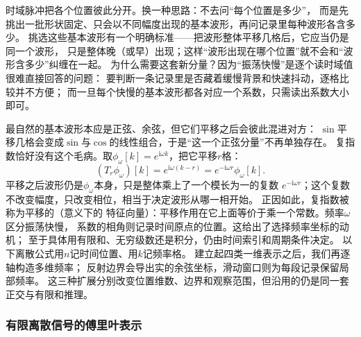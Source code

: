 时域脉冲把各个位置彼此分开。换一种思路：不去问“每个位置是多少”，
而是先挑出一批形状固定、只会以不同幅度出现的基本波形，再问记录里每种波形各含多少。
挑选这些基本波形有一个明确标准——把波形整体平移几格后，它应当仍是同一个波形，
只是整体晚（或早）出现；这样“波形出现在哪个位置”就不会和“波形含多少”纠缠在一起。
为什么需要这套新分量？因为“振荡快慢”是逐个读时域值很难直接回答的问题：
要判断一条记录里是否藏着缓慢背景和快速抖动，逐格比较并不方便；
而一旦每个快慢的基本波形都各对应一个系数，只需读出系数大小即可。

最自然的基本波形本应是正弦、余弦，但它们平移之后会彼此混进对方：
$\sin$平移几格会变成$\sin$与$\cos$的线性组合，于是“这一个正弦分量”不再单独存在。
复指数恰好没有这个毛病。取$\phi_\omega[k]=e^{\mathrm i\omega k}$，把它平移$r$格：
\[
  (T_r\phi_\omega)[k]
  =e^{\mathrm i\omega(k-r)}
  =e^{-\mathrm i\omega r}\phi_\omega[k].
\]
平移之后波形仍是$\phi_\omega$本身，只是整体乘上了一个模长为一的复数
$e^{-\mathrm i\omega r}$；这个复数不改变幅度，只改变相位，相当于决定波形从哪一相开始。
正因如此，复指数被称为平移的（意义下的
特征向量）：平移作用在它上面等价于乘一个常数。频率$\omega$区分振荡快慢，
系数的相角则记录时间原点的位置。这给出了选择频率坐标的动机；
至于具体用有限和、无穷级数还是积分，仍由时间索引和周期条件决定。
以下离散公式用$n$记时间位置、用$k$记频率格。
建立起四类一维表示之后，我们再逐轴构造多维频率；
反射边界会导出实的余弦坐标，滑动窗口则为每段记录保留局部频率。
这三种扩展分别改变位置维数、边界和观察范围，但沿用的仍是同一套正交与有限和推理。

\subsubsection{有限离散信号的傅里叶表示}

